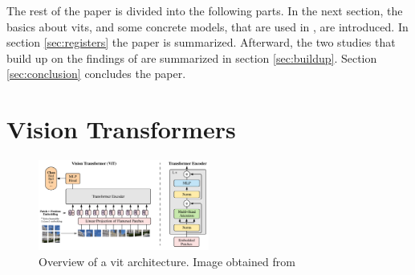 \documentclass[conference]{IEEEtran}
\begin{document}
  The rest of the paper is divided into the following parts. In the next section, the basics about \acp{vit}, and some concrete models, that are used in \cite{registers}, are introduced. In section \ref{sec:registers} the paper \cite{registers} is summarized. Afterward, the two studies \cite{mamba-needs-registers} \cite{denoising} that build up on the findings of \cite{registers} are summarized in section \ref{sec:buildup}. Section \ref{sec:conclusion} concludes the paper.

  \section{Vision Transformers}
  \label{sec:vits}

  \begin{figure}
    \centering
    \includegraphics[width=0.5\textwidth]{figures/vit-architecture.png}
    \caption{Overview of a \ac{vit} architecture. Image obtained from \cite{visiontransformers2021}}
    \label{fig:vit-architecture}
  \end{figure}
\end{document}
